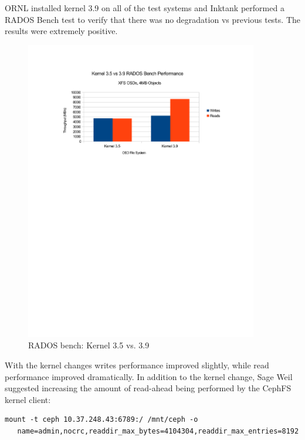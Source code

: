 \documentclass{article}
\begin{document}
ORNL installed kernel 3.9 on all of the test systems and Inktank performed a
RADOS Bench test to verify that there was no degradation vs previous tests.  The
results were extremely positive.


\begin{figure}[htb]
\centering
\includegraphics[width=4in]{rados-kernel-35vs39}
\caption{RADOS bench: Kernel 3.5 vs. 3.9}
\label{fig:rados-kernel}
\end{figure}



With the kernel changes writes performance improved slightly, while read
performance improved dramatically.  In addition to the kernel change, Sage Weil
suggested increasing the amount of read-ahead being performed by the CephFS
kernel client:

\begin{Verbatim}[samepage=true]
mount -t ceph 10.37.248.43:6789:/ /mnt/ceph -o
   name=admin,nocrc,readdir_max_bytes=4104304,readdir_max_entries=8192
\end{Verbatim}
\end{document}
